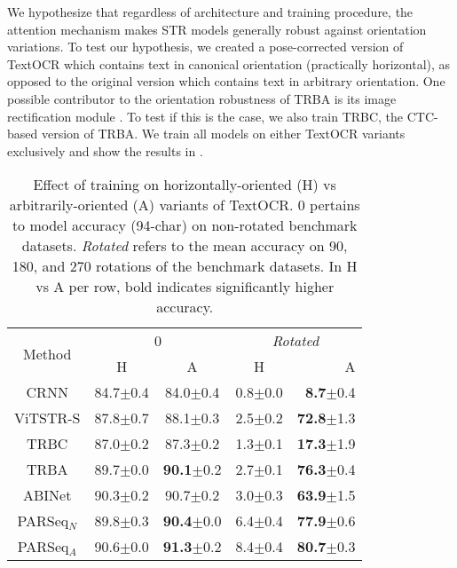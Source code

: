 We hypothesize that regardless of architecture and training procedure, the attention mechanism makes STR models generally robust against orientation variations. To test our hypothesis, we created a pose-corrected version of TextOCR which contains text in canonical orientation (practically horizontal), as opposed to the original version which contains text in arbitrary orientation. One possible contributor to the orientation robustness of TRBA is its image rectification module \cite{shi2016robust}. To test if this is the case, we also train TRBC, the CTC-based version of TRBA. We train all models on either TextOCR variants exclusively and show the results in .

\begin{table}[htbp]
  \centering
  \scriptsize
  \setlength{\tabcolsep}{10pt}
  \caption{Effect of training on horizontally-oriented (H) vs arbitrarily-oriented (A) variants of TextOCR. 0\textdegree{} pertains to model accuracy (94-char) on non-rotated benchmark datasets. \textit{Rotated} refers to the mean accuracy on 90\textdegree, 180\textdegree, and 270\textdegree{} rotations of the benchmark datasets. In H vs A per row, bold indicates significantly higher accuracy.}
  \begin{tabular}{ c | c c | c r }
    \toprule
    \multirow{2}{*}{Method} & \multicolumn{2}{c|}{0\textdegree{}} & \multicolumn{2}{c}{\textit{Rotated}} \\
    & H & A & H & A\hspace{14pt} \\
    \midrule
    CRNN & 84.7$\pm$0.4 & 84.0$\pm$0.4 & 0.8$\pm$0.0 & \textbf{8.7}$\pm$0.4 \\
    ViTSTR-S & 87.8$\pm$0.7 & 88.1$\pm$0.3 & 2.5$\pm$0.2 & \textbf{72.8}$\pm$1.3 \\
    TRBC & 87.0$\pm$0.2 & 87.3$\pm$0.2 & 1.3$\pm$0.1 & \textbf{17.3}$\pm$1.9 \\
    TRBA & 89.7$\pm$0.0 & \textbf{90.1}$\pm$0.2 & 2.7$\pm$0.1 & \textbf{76.3}$\pm$0.4 \\
    ABINet & 90.3$\pm$0.2 & 90.7$\pm$0.2 & 3.0$\pm$0.3 & \textbf{63.9}$\pm$1.5 \\
    \midrule
    PARSeq$_{N}$ & 89.8$\pm$0.3 & \textbf{90.4}$\pm$0.0 & 6.4$\pm$0.4 & \textbf{77.9}$\pm$0.6 \\
    PARSeq$_{A}$ & 90.6$\pm$0.0 & \textbf{91.3}$\pm$0.2 & 8.4$\pm$0.4 & \textbf{80.7}$\pm$0.3 \\
    \bottomrule
  \end{tabular}
  \label{tab:horizontal-vs-arbitrary}
\end{table}

